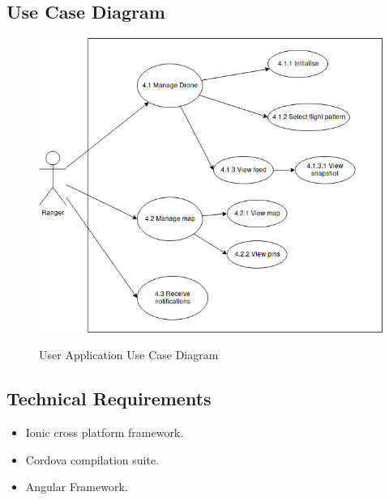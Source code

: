 \subsection{Use Case Diagram}
	\begin{center}
		\begin{figure}[h!]
			\centering
			\includegraphics[scale=0.45]{./assets/images/application-ucd.jpg}
			\label{fig: user-application-ucd }
			\caption{User Application Use Case Diagram}
		\end{figure}
	\end{center}

\subsection{Technical Requirements}
	\begin{flushleft}
		\begin{itemize}
				\item Ionic cross platform framework.
				\item Cordova compilation suite.
				\item Angular Framework.
		\end{itemize}
	\end{flushleft}

